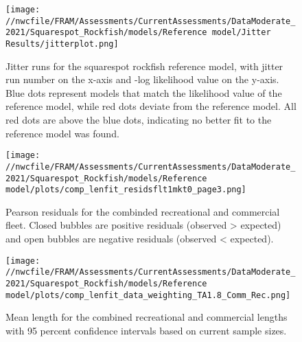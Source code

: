 \documentclass[11pt,
  english,
  a4paper,
]{article}
\begin{document}

\begin{figure}
\centering
\texttt{[image: //nwcfile/FRAM/Assessments/CurrentAssessments/DataModerate\_2021/Squarespot\_Rockfish/models/Reference model/Jitter Results/jitterplot.png]}
\caption{Jitter runs for the squarespot rockfish reference model, with jitter run number on the x-axis and -log likelihood value on the y-axis. Blue dots represent models that match the likelihood value of the reference model, while red dots deviate from the reference model. All red dots are above the blue dots, indicating no better fit to the reference model was found.\label{fig:jitter_01}}
\end{figure}

\tagmcend\tagstructend


\begin{figure}
\centering
\texttt{[image: //nwcfile/FRAM/Assessments/CurrentAssessments/DataModerate\_2021/Squarespot\_Rockfish/models/Reference model/plots/comp\_lenfit\_residsflt1mkt0\_page3.png]}
\caption{Pearson residuals for the combinded recreational and commercial fleet. Closed bubbles are positive residuals (observed \textgreater{} expected) and open bubbles are negative residuals (observed \textless{} expected).\label{fig:rec-com-pearson}}
\end{figure}

\tagmcend\tagstructend


\begin{figure}
\centering
\texttt{[image: //nwcfile/FRAM/Assessments/CurrentAssessments/DataModerate\_2021/Squarespot\_Rockfish/models/Reference model/plots/comp\_lenfit\_data\_weighting\_TA1.8\_Comm\_Rec.png]}
\caption{Mean length for the combined recreational and commercial lengths with 95 percent confidence intervals based on current sample sizes.\label{fig:rec-com-mean-len-fit}}
\end{figure}
\end{document}
